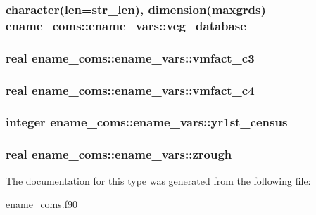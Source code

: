 \subsubsection[{veg\+\_\+database}]{\setlength{\rightskip}{0pt plus 5cm}character(len=str\+\_\+len), dimension(maxgrds) ename\+\_\+coms\+::ename\+\_\+vars\+::veg\+\_\+database}\label{structename__coms_1_1ename__vars_afe4637288a5043b6e185316403d77761}
\hypertarget{structename__coms_1_1ename__vars_a824d9752aa9667789e0e9b25c1565790}{}
\subsubsection[{vmfact\+\_\+c3}]{\setlength{\rightskip}{0pt plus 5cm}real ename\+\_\+coms\+::ename\+\_\+vars\+::vmfact\+\_\+c3}\label{structename__coms_1_1ename__vars_a824d9752aa9667789e0e9b25c1565790}
\hypertarget{structename__coms_1_1ename__vars_a2f01234a00dc942fb411cb76aede6b9b}{}
\subsubsection[{vmfact\+\_\+c4}]{\setlength{\rightskip}{0pt plus 5cm}real ename\+\_\+coms\+::ename\+\_\+vars\+::vmfact\+\_\+c4}\label{structename__coms_1_1ename__vars_a2f01234a00dc942fb411cb76aede6b9b}
\hypertarget{structename__coms_1_1ename__vars_af95f646dffc7bafbdef282c1e0a0b915}{}
\subsubsection[{yr1st\+\_\+census}]{\setlength{\rightskip}{0pt plus 5cm}integer ename\+\_\+coms\+::ename\+\_\+vars\+::yr1st\+\_\+census}\label{structename__coms_1_1ename__vars_af95f646dffc7bafbdef282c1e0a0b915}
\hypertarget{structename__coms_1_1ename__vars_a3d58740a12137c047498e7ea2e9482d7}{}
\subsubsection[{zrough}]{\setlength{\rightskip}{0pt plus 5cm}real ename\+\_\+coms\+::ename\+\_\+vars\+::zrough}\label{structename__coms_1_1ename__vars_a3d58740a12137c047498e7ea2e9482d7}


The documentation for this type was generated from the following file\+:\begin{DoxyCompactItemize}
\item 
\hyperlink{ename__coms_8f90}{ename\+\_\+coms.\+f90}\end{DoxyCompactItemize}
